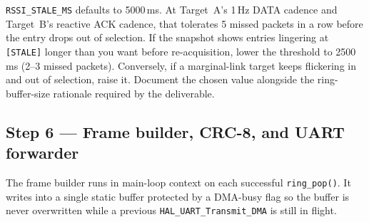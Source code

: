 \documentclass[11pt,letterpaper]{article}
\begin{document}
\begin{tcolorbox}[infobox={Tuning the staleness window}]
\texttt{RSSI\_STALE\_MS} defaults to 5000\,ms. At Target~A's 1\,Hz DATA cadence and Target~B's reactive ACK cadence, that tolerates 5 missed packets in a row before the entry drops out of selection. If the snapshot shows entries lingering at \texttt{[STALE]} longer than you want before re-acquisition, lower the threshold to 2500\,ms (2--3 missed packets). Conversely, if a marginal-link target keeps flickering in and out of selection, raise it. Document the chosen value alongside the ring-buffer-size rationale required by the deliverable.
\end{tcolorbox}

\subsection{Step 6 --- Frame builder, CRC-8, and UART forwarder}

The frame builder runs in main-loop context on each successful \texttt{ring\_pop()}. It writes into a single static buffer protected by a DMA-busy flag so the buffer is never overwritten while a previous \texttt{HAL\_UART\_Transmit\_DMA} is still in flight.
\end{document}
